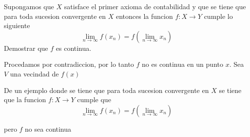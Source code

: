 \documentclass[../main.tex]{subfiles}
\begin{document}
\begin{problem}
  Supongamos que $X$ satisface el primer axioma de contabilidad y que se tiene que para toda
  sucesion convergente en $X$ entonces la funcion $f: X \to Y$ cumple lo siguiente
  \begin{equation*}
    \lim_{n \to \infty} f(x_{n}) = f(\lim_{n \to \infty}  x_{n})
  \end{equation*}
  Demostrar que $f$ es continua.
\end{problem}
\begin{solution}
  Procedamos por contradiccion, por lo tanto $f$ no es continua en un punto $x$. Sea $V$ una vecindad de $f(x)$
\end{solution}

\begin{problem}
  De un ejemplo donde se tiene que para toda sucesion convergente en $X$ se tiene que la funcion $f : X \to Y$ cumple que
  \begin{equation*}
    \lim_{n \to \infty} f(x_{n}) = f(\lim_{n \to \infty}  x_{n})
  \end{equation*}

  pero $f$ no sea continua
\end{problem}
\end{document}
